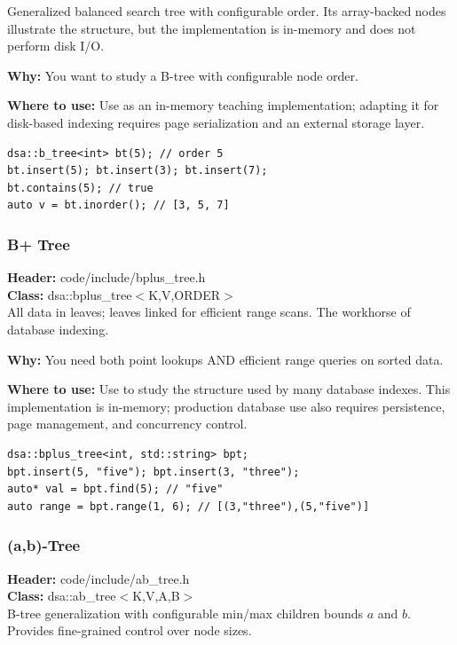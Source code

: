 \documentclass[11pt]{article}
\begin{document}
Generalized balanced search tree with configurable order. Its array-backed nodes illustrate the structure, but the implementation is in-memory and does not perform disk I/O.

\textbf{Why:} You want to study a B-tree with configurable node order. \par \textbf{Where to use:} Use as an in-memory teaching implementation; adapting it for disk-based indexing requires page serialization and an external storage layer.

\begin{lstlisting}
dsa::b_tree<int> bt(5); // order 5
bt.insert(5); bt.insert(3); bt.insert(7);
bt.contains(5); // true
auto v = bt.inorder(); // [3, 5, 7]
\end{lstlisting}

\subsubsection{B+ Tree}
\textbf{Header:} code/include/bplus\_tree.h\\
\textbf{Class:} dsa::bplus\_tree$<$K,V,ORDER$>$\\

All data in leaves; leaves linked for efficient range scans. The workhorse of database indexing.

\textbf{Why:} You need both point lookups AND efficient range queries on sorted data. \par \textbf{Where to use:} Use to study the structure used by many database indexes. This implementation is in-memory; production database use also requires persistence, page management, and concurrency control.

\begin{lstlisting}
dsa::bplus_tree<int, std::string> bpt;
bpt.insert(5, "five"); bpt.insert(3, "three");
auto* val = bpt.find(5); // "five"
auto range = bpt.range(1, 6); // [(3,"three"),(5,"five")]
\end{lstlisting}

\subsubsection{(a,b)-Tree}
\textbf{Header:} code/include/ab\_tree.h\\
\textbf{Class:} dsa::ab\_tree$<$K,V,A,B$>$\\

B-tree generalization with configurable min/max children bounds $a$ and $b$. Provides fine-grained control over node sizes.
\end{document}
